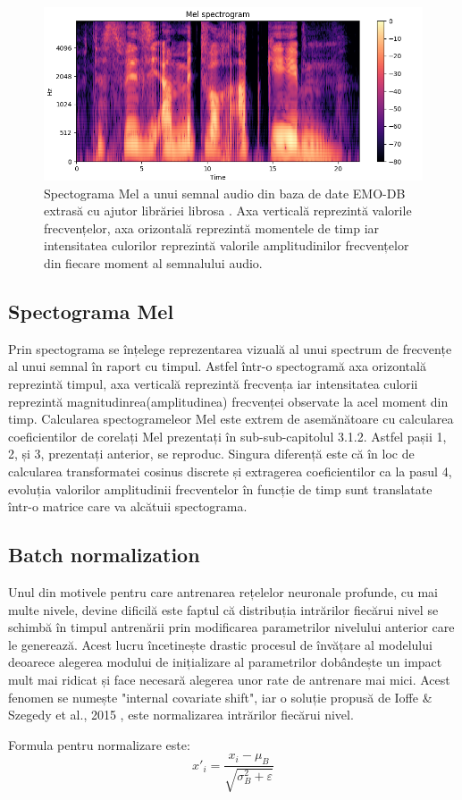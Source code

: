 \documentclass[a4paper,12pt]{book}
\begin{document}
			\begin{figure}[h]
				\centering
				\includegraphics[scale=0.50]{melspectogram}
				\caption{Spectograma Mel a unui semnal audio din baza de date EMO-DB extrasă cu ajutor librăriei librosa \cite{librosa}. Axa verticală reprezintă valorile frecvențelor, axa orizontală reprezintă momentele de timp iar intensitatea culorilor reprezintă valorile amplitudinilor frecvențelor din fiecare moment al semnalului audio.
				}
				\label{fig:melspec}
			\end{figure}
			
			\subsection{Spectograma Mel} \label{mel}
				Prin spectograma se înțelege reprezentarea vizuală al unui spectrum de frecvențe al unui semnal în raport cu timpul. Astfel într-o spectogramă axa orizontală reprezintă timpul, axa verticală reprezintă frecvența iar intensitatea culorii reprezintă magnitudinrea(amplitudinea) frecvenței observate la acel moment din timp. Calcularea spectogrameleor Mel este extrem de asemănătoare cu calcularea coeficientilor de corelați Mel prezentați în sub-sub-capitolul 3.1.2. Astfel pașii 1, 2, și 3, prezentați anterior, se reproduc. Singura diferență este că în loc de calcularea transformatei cosinus discrete și extragerea coeficientilor ca la pasul 4, evoluția valorilor amplitudinii frecventelor în funcție de timp sunt translatate într-o matrice care va alcătuii spectograma. \par
			\subsection{Batch normalization} \label{batch-norn}
				Unul din motivele pentru care antrenarea rețelelor neuronale profunde, cu mai multe nivele, devine dificilă este faptul că distribuția intrărilor fiecărui nivel se schimbă în timpul antrenării prin modificarea parametrilor nivelului anterior care le generează. Acest lucru încetinește drastic procesul de învățare al modelului deoarece alegerea modului de inițializare al parametrilor dobândește un impact mult mai ridicat și face necesară alegerea unor rate de antrenare mai mici. Acest fenomen se numește "internal covariate shift", iar o soluție propusă de Ioffe \& Szegedy et al., 2015 \cite{batch_norm}, este normalizarea intrărilor fiecărui nivel. \par Formula pentru normalizare este:
				\begin{equation*}
					x'_i = \frac{x_i - \mu_B}{\sqrt{\sigma^2_B +  \varepsilon}}
				\end{equation*}
				
\end{document}
